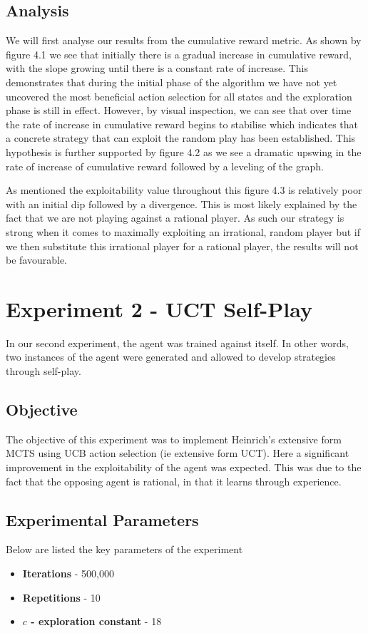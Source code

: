 \subsection{Analysis}\label{subsec:analysis1}
We will first analyse our results from the cumulative reward metric.
As shown by figure 4.1 we see that initially there is a gradual increase in cumulative reward,
with the slope growing until there is a constant rate of increase.
This demonstrates that during the initial phase of the algorithm we have not yet uncovered
the most beneficial action selection for all states and the exploration phase is still in effect.
However, by visual inspection, we can see that over time the rate of increase in cumulative
reward begins to stabilise which indicates that a concrete strategy that can exploit
the random play has been established.
This hypothesis is further supported by figure 4.2 as we see a dramatic upswing
in the rate of increase of cumulative reward followed by a leveling of the graph.

As mentioned the exploitability value throughout this figure 4.3 is relatively poor with an initial dip followed
by a divergence.
This is most likely explained by the fact that we are not playing against a rational player.
As such our strategy is strong when it comes to maximally exploiting an irrational, random player
but if we then substitute this irrational player for a rational player, the results will not be favourable.

\section{Experiment 2 - UCT Self-Play} \label{sec:experiment2}
In our second experiment, the agent was trained against itself.
In other words, two instances of the agent were generated and allowed to develop strategies
through self-play.

\subsection{Objective}\label{subsec:objective2}
The objective of this experiment was to implement Heinrich's extensive form MCTS using UCB action
selection (ie extensive form UCT).
Here a significant improvement in the exploitability of the agent was expected.
This was due to the fact that the opposing agent is rational, in that it learns
through experience.


\subsection{Experimental Parameters}\label{subsec:algAndCoding2}
Below are listed the key parameters of the experiment
\begin{itemize}
    \item \textbf{Iterations} - 500,000
    \item \textbf{Repetitions} - 10
    \item \textbf{$c$ - exploration constant} - 18
\end{itemize}

